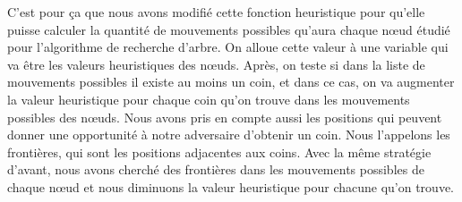 \documentclass[a4paper,12pt]{article}
\begin{document}
\vspace{\baselineskip}

\noindent \begin{justify}
C’est pour ça que nous avons modifié cette fonction heuristique pour qu’elle puisse calculer la quantité de mouvements possibles qu’aura chaque nœud étudié pour l’algorithme de recherche d’arbre. On alloue cette valeur à une variable qui va être les valeurs heuristiques des nœuds. Après, on teste si dans la liste de mouvements possibles il existe au moins un coin, et dans ce cas, on va augmenter la valeur heuristique pour chaque coin qu’on trouve dans les mouvements possibles des nœuds. Nous avons pris en compte aussi les positions qui peuvent donner une opportunité à notre adversaire d’obtenir un coin. Nous l’appelons les frontières, qui sont les positions adjacentes aux coins. Avec la même stratégie d’avant, nous avons cherché des frontières dans les mouvements possibles de chaque nœud et nous diminuons la valeur heuristique pour chacune qu’on trouve.
\end{justify}\par


\vspace{\baselineskip}
\end{document}
